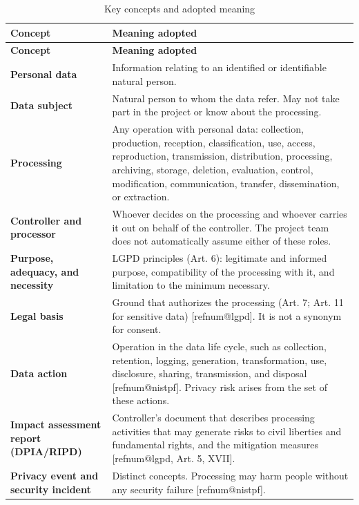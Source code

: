 \documentclass[12pt,a4paper,article,oneside,brazil,english]{abntex2}
\makeatletter
\newcommand{\fontetab}[1]{\par\vspace{3pt}{\small\noindent Source: #1\par}}
\newcommand{\refnum}[1]{\csname refnum@#1\endcsname}
\newcommand{\cit}[1]{[\refnum{#1}]}
\makeatother
\begin{document}
\begingroup\SingleSpacing\small
\begin{longtable}{@{}>{\raggedright\arraybackslash}p{}>{\raggedright\arraybackslash}p{}@{}}
\caption{Key concepts and adopted meaning}\label{tab:t2}\\
\hline
\textbf{Concept} & \textbf{Meaning adopted}\\
\hline
\endfirsthead
\hline
\textbf{Concept} & \textbf{Meaning adopted}\\
\hline
\endhead
\hline
\endfoot
\hline
\endlastfoot
\textbf{Personal data} & Information relating to an identified or identifiable natural person.\\[3pt]
\textbf{Data subject} & Natural person to whom the data refer. May not take part in the project or know about the processing.\\[3pt]
\textbf{Processing} & Any operation with personal data: collection, production, reception, classification, use, access, reproduction, transmission, distribution, processing, archiving, storage, deletion, evaluation, control, modification, communication, transfer, dissemination, or extraction.\\[3pt]
\textbf{Controller and processor} & Whoever decides on the processing and whoever carries it out on behalf of the controller. The project team does not automatically assume either of these roles.\\[3pt]
\textbf{Purpose, adequacy, and necessity} & LGPD principles (Art. 6): legitimate and informed purpose, compatibility of the processing with it, and limitation to the minimum necessary.\\[3pt]
\textbf{Legal basis} & Ground that authorizes the processing (Art. 7; Art. 11 for sensitive data) [\refnum{lgpd}]. It is not a synonym for consent.\\[3pt]
\textbf{Data action} & Operation in the data life cycle, such as collection, retention, logging, generation, transformation, use, disclosure, sharing, transmission, and disposal [\refnum{nistpf}]. Privacy risk arises from the set of these actions.\\[3pt]
\textbf{Impact assessment report (DPIA/RIPD)} & Controller's document that describes processing activities that may generate risks to civil liberties and fundamental rights, and the mitigation measures [\refnum{lgpd}, Art. 5, XVII].\\[3pt]
\textbf{Privacy event and security incident} & Distinct concepts. Processing may harm people without any security failure [\refnum{nistpf}].\\[3pt]
\end{longtable}
\endgroup
\fontetab{Prepared by the authors (2026), based on \cit{lgpd} and \cit{nistpf}.}
\end{document}
